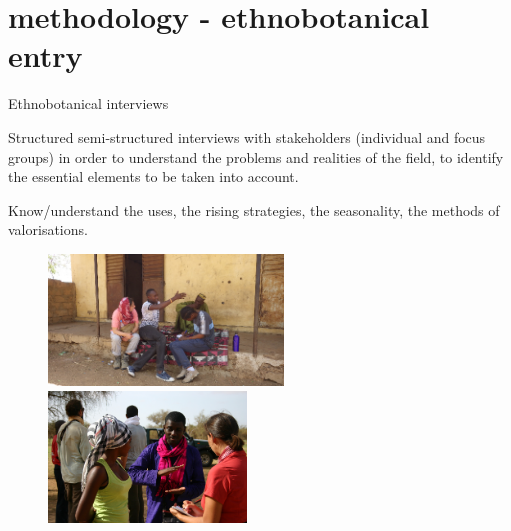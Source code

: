 \documentclass[newPxFont]{beamer}
\begin{document}
\section{methodology - ethnobotanical entry}

\begin{frame}[c]{Ethnobotanical interviews}
\vspace{-1cm}

Structured semi-structured interviews with stakeholders (individual and focus groups) in order to understand the problems and realities of the field, to identify the essential elements to be taken into account.

Know/understand the uses, the rising strategies, the seasonality, the methods of valorisations.


\begin{figure}
	\hspace{-1.5em}
	\includegraphics[height = 3.5cm]{img/group3.png}~
  \includegraphics[height = 3.5cm]{img/group2.png}
\end{figure}
\end{frame}
\end{document}
